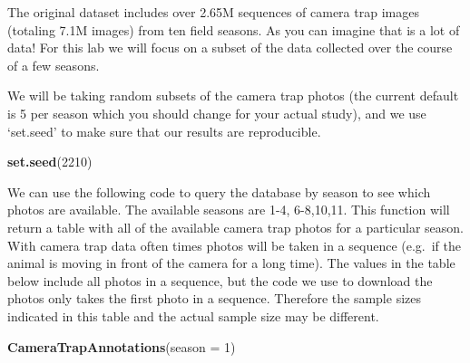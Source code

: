 \documentclass[]{book}
\newenvironment{Shaded}{\begin{snugshade}}{\end{snugshade}}
\newcommand{\DataTypeTok}[1]{\textcolor[rgb]{0.13,0.29,0.53}{#1}}
\newcommand{\DecValTok}[1]{\textcolor[rgb]{0.00,0.00,0.81}{#1}}
\newcommand{\KeywordTok}[1]{\textcolor[rgb]{0.13,0.29,0.53}{\textbf{#1}}}
\newcommand{\NormalTok}[1]{#1}
\begin{document}
The original dataset includes over 2.65M sequences of camera trap images (totaling 7.1M images) from ten field seasons. As you can imagine that is a lot of data! For this lab we will focus on a subset of the data collected over the course of a few seasons.

We will be taking random subsets of the camera trap photos (the current default is 5 per season which you should change for your actual study), and we use `set.seed' to make sure that our results are reproducible.

\begin{Shaded}
\begin{Highlighting}[]
\KeywordTok{set.seed}\NormalTok{(}\DecValTok{2210}\NormalTok{)}
\end{Highlighting}
\end{Shaded}

We can use the following code to query the database by season to see which photos are available. The available seasons are 1-4, 6-8,10,11. This function will return a table with all of the available camera trap photos for a particular season. With camera trap data often times photos will be taken in a sequence (e.g.~if the animal is moving in front of the camera for a long time). The values in the table below include all photos in a sequence, but the code we use to download the photos only takes the first photo in a sequence. Therefore the sample sizes indicated in this table and the actual sample size may be different.

\begin{Shaded}
\begin{Highlighting}[]
\KeywordTok{CameraTrapAnnotations}\NormalTok{(}\DataTypeTok{season =} \DecValTok{1}\NormalTok{)}
\end{Highlighting}
\end{Shaded}
\end{document}
